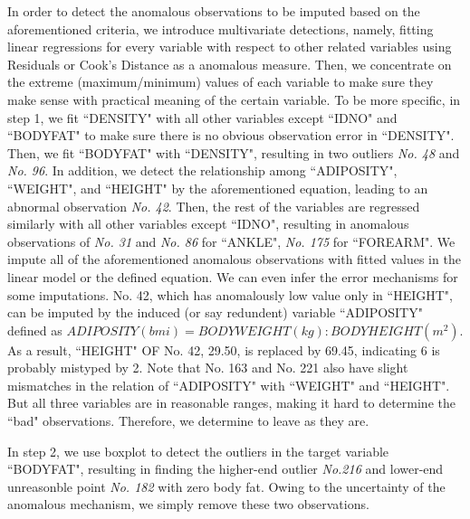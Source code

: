 \documentclass[]{article}
\begin{document}
In order to detect the anomalous observations to be imputed based on the aforementioned criteria, we introduce multivariate detections, namely, fitting linear regressions for every variable with respect to other related variables using Residuals or Cook's Distance as a anomalous measure. Then, we concentrate on the extreme (maximum/minimum) values of each variable to make sure they make sense with practical meaning of the certain variable. To be more specific, in step 1, we fit ``DENSITY" with all other variables except ``IDNO" and ``BODYFAT" to make sure there is no obvious observation error in ``DENSITY". Then, we fit ``BODYFAT" with ``DENSITY", resulting in two outliers \emph{No. 48} and \emph{No. 96}. In addition, we detect the relationship among ``ADIPOSITY", ``WEIGHT", and ``HEIGHT" by the aforementioned equation, leading to an abnormal observation \emph{No. 42}. Then, the rest of the variables are regressed similarly with all other variables except ``IDNO", resulting in anomalous observations of \emph{No. 31} and \emph{No. 86} for ``ANKLE", \emph{No. 175} for ``FOREARM". We impute all of the aforementioned anomalous observations with fitted values in the linear model or the defined equation. We can even infer the error mechanisms for some imputations. No. 42, which has anomalously low value only in ``HEIGHT", can be imputed by the induced (or say redundent) variable ``ADIPOSITY" defined as 
$ADIPOSITY(bmi) = BODY WEIGHT(kg) : BODY HEIGHT(m^2).$
As a result, ``HEIGHT" OF No. 42, 29.50, is replaced by 69.45, indicating 6 is probably mistyped by 2. Note that No. 163 and No. 221 also have slight mismatches in the relation of ``ADIPOSITY" with ``WEIGHT" and ``HEIGHT". But all three variables are in reasonable ranges, making it hard to determine the ``bad" observations. Therefore, we determine to leave as they are. 

In step 2, we use boxplot to detect the outliers in the target variable ``BODYFAT", resulting in finding the higher-end outlier \emph{No.216} and lower-end unreasonble point \emph{No. 182} with zero body fat. Owing to the uncertainty of the anomalous mechanism, we simply remove these two observations. 
\end{document}
